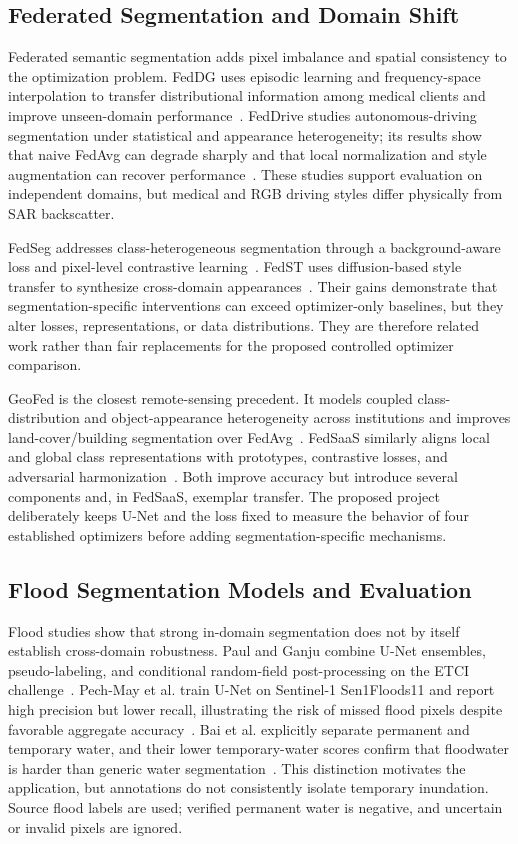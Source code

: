 \documentclass[conference]{IEEEtran}
\begin{document}
\subsection{Federated Segmentation and Domain Shift}
Federated semantic segmentation adds pixel imbalance and spatial consistency to the optimization problem. FedDG uses episodic learning and frequency-space interpolation to transfer distributional information among medical clients and improve unseen-domain performance~\cite{liu2021feddg}. FedDrive studies autonomous-driving segmentation under statistical and appearance heterogeneity; its results show that naive FedAvg can degrade sharply and that local normalization and style augmentation can recover performance~\cite{fantauzzo2022feddrive}. These studies support evaluation on independent domains, but medical and RGB driving styles differ physically from SAR backscatter.

FedSeg addresses class-heterogeneous segmentation through a background-aware loss and pixel-level contrastive learning~\cite{miao2023fedseg}. FedST uses diffusion-based style transfer to synthesize cross-domain appearances~\cite{ma2024fedst}. Their gains demonstrate that segmentation-specific interventions can exceed optimizer-only baselines, but they alter losses, representations, or data distributions. They are therefore related work rather than fair replacements for the proposed controlled optimizer comparison.

GeoFed is the closest remote-sensing precedent. It models coupled class-distribution and object-appearance heterogeneity across institutions and improves land-cover/building segmentation over FedAvg~\cite{tan2024bridging}. FedSaaS similarly aligns local and global class representations with prototypes, contrastive losses, and adversarial harmonization~\cite{yu2025fedsaas}. Both improve accuracy but introduce several components and, in FedSaaS, exemplar transfer. The proposed project deliberately keeps U-Net and the loss fixed to measure the behavior of four established optimizers before adding segmentation-specific mechanisms.

\subsection{Flood Segmentation Models and Evaluation}
Flood studies show that strong in-domain segmentation does not by itself establish cross-domain robustness. Paul and Ganju combine U-Net ensembles, pseudo-labeling, and conditional random-field post-processing on the ETCI challenge~\cite{paul2021flood}. Pech-May et al. train U-Net on Sentinel-1 Sen1Floods11 and report high precision but lower recall, illustrating the risk of missed flood pixels despite favorable aggregate accuracy~\cite{pechmay2024segmentation}. Bai et al. explicitly separate permanent and temporary water, and their lower temporary-water scores confirm that floodwater is harder than generic water segmentation~\cite{bai2021enhancement}. This distinction motivates the application, but annotations do not consistently isolate temporary inundation. Source flood labels are used; verified permanent water is negative, and uncertain or invalid pixels are ignored.
\end{document}
